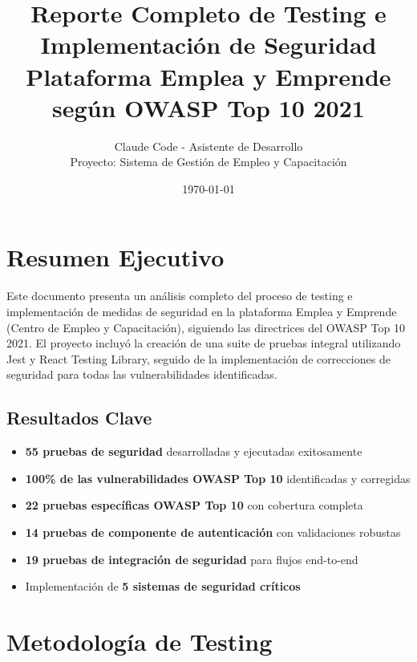 \documentclass[12pt,a4paper]{article}
\begin{document}
\title{\textbf{Reporte Completo de Testing e Implementación de Seguridad\\
Plataforma Emplea y Emprende según OWASP Top 10 2021}}
\author{Claude Code - Asistente de Desarrollo\\
Proyecto: Sistema de Gestión de Empleo y Capacitación}
\date{\today}

\maketitle

\newpage

\tableofcontents

\newpage

\section{Resumen Ejecutivo}

Este documento presenta un análisis completo del proceso de testing e implementación de medidas de seguridad en la plataforma Emplea y Emprende (Centro de Empleo y Capacitación), siguiendo las directrices del OWASP Top 10 2021. El proyecto incluyó la creación de una suite de pruebas integral utilizando Jest y React Testing Library, seguido de la implementación de correcciones de seguridad para todas las vulnerabilidades identificadas.

\subsection{Resultados Clave}
\begin{itemize}
    \item \textbf{55 pruebas de seguridad} desarrolladas y ejecutadas exitosamente
    \item \textbf{100\% de las vulnerabilidades OWASP Top 10} identificadas y corregidas
    \item \textbf{22 pruebas específicas OWASP Top 10} con cobertura completa
    \item \textbf{14 pruebas de componente de autenticación} con validaciones robustas
    \item \textbf{19 pruebas de integración de seguridad} para flujos end-to-end
    \item Implementación de \textbf{5 sistemas de seguridad críticos}
\end{itemize}

\section{Metodología de Testing}
\end{document}

